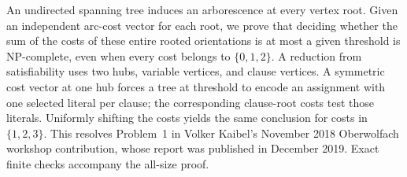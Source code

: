 
An undirected spanning tree induces an arborescence at every vertex root.
Given an independent arc-cost vector for each root, we prove that deciding
whether the sum of the costs of these entire rooted orientations is at most
a given threshold is NP-complete, even when every cost belongs to
$\{0,1,2\}$. A reduction from satisfiability uses two hubs, variable vertices,
and clause vertices. A symmetric cost vector at one hub forces a tree at
threshold to encode an assignment with one selected literal per clause;
the corresponding clause-root costs test those literals. Uniformly shifting
the costs yields the same conclusion for costs in $\{1,2,3\}$. This resolves
Problem~1 in Volker Kaibel's November 2018 Oberwolfach workshop contribution,
whose report was published in December 2019. Exact finite checks accompany
the all-size proof.
